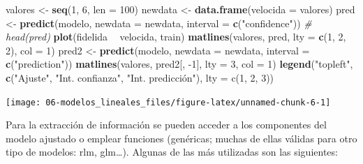 \documentclass[
  spanish,
]{book}
\newenvironment{Shaded}{\begin{snugshade}}{\end{snugshade}}
\newcommand{\CommentTok}[1]{\textcolor[rgb]{0.56,0.35,0.01}{\textit{#1}}}
\newcommand{\DataTypeTok}[1]{\textcolor[rgb]{0.13,0.29,0.53}{#1}}
\newcommand{\DecValTok}[1]{\textcolor[rgb]{0.00,0.00,0.81}{#1}}
\newcommand{\KeywordTok}[1]{\textcolor[rgb]{0.13,0.29,0.53}{\textbf{#1}}}
\newcommand{\NormalTok}[1]{#1}
\newcommand{\OperatorTok}[1]{\textcolor[rgb]{0.81,0.36,0.00}{\textbf{#1}}}
\newcommand{\StringTok}[1]{\textcolor[rgb]{0.31,0.60,0.02}{#1}}
\theoremstyle{break}
\theoremstyle{definition}
\theoremstyle{definition}
\theoremstyle{definition}
\theoremstyle{remark}
\begin{document}
\begin{Shaded}
\begin{Highlighting}[]
\NormalTok{valores <-}\StringTok{ }\KeywordTok{seq}\NormalTok{(}\DecValTok{1}\NormalTok{, }\DecValTok{6}\NormalTok{, }\DataTypeTok{len =} \DecValTok{100}\NormalTok{)}
\NormalTok{newdata <-}\StringTok{ }\KeywordTok{data.frame}\NormalTok{(}\DataTypeTok{velocida =}\NormalTok{ valores)}
\NormalTok{pred <-}\StringTok{ }\KeywordTok{predict}\NormalTok{(modelo, }\DataTypeTok{newdata =}\NormalTok{ newdata, }\DataTypeTok{interval =} \KeywordTok{c}\NormalTok{(}\StringTok{"confidence"}\NormalTok{))}
\CommentTok{# head(pred)}
\KeywordTok{plot}\NormalTok{(fidelida }\OperatorTok{~}\StringTok{ }\NormalTok{velocida, train)}
\KeywordTok{matlines}\NormalTok{(valores, pred, }\DataTypeTok{lty =} \KeywordTok{c}\NormalTok{(}\DecValTok{1}\NormalTok{, }\DecValTok{2}\NormalTok{, }\DecValTok{2}\NormalTok{), }\DataTypeTok{col =} \DecValTok{1}\NormalTok{)}
\NormalTok{pred2 <-}\StringTok{ }\KeywordTok{predict}\NormalTok{(modelo, }\DataTypeTok{newdata =}\NormalTok{ newdata, }\DataTypeTok{interval =} \KeywordTok{c}\NormalTok{(}\StringTok{"prediction"}\NormalTok{))}
\KeywordTok{matlines}\NormalTok{(valores, pred2[, }\DecValTok{-1}\NormalTok{], }\DataTypeTok{lty =} \DecValTok{3}\NormalTok{, }\DataTypeTok{col =} \DecValTok{1}\NormalTok{)}
\KeywordTok{legend}\NormalTok{(}\StringTok{"topleft"}\NormalTok{, }\KeywordTok{c}\NormalTok{(}\StringTok{"Ajuste"}\NormalTok{, }\StringTok{"Int. confianza"}\NormalTok{, }\StringTok{"Int. predicción"), lty = c(1, 2, 3))}
\end{Highlighting}
\end{Shaded}

\begin{center}\texttt{[image: 06-modelos\_lineales\_files/figure-latex/unnamed-chunk-6-1]} \end{center}

Para la extracción de información se pueden acceder a los componentes del modelo ajustado o emplear funciones (genéricas; muchas de ellas válidas para otro tipo de modelos: rlm, glm\ldots).
Algunas de las más utilizadas son las siguientes:
\end{document}
